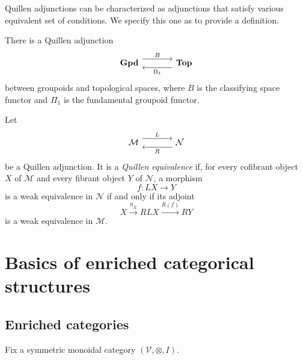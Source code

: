 \documentclass{tac}
\begin{document}
Quillen adjunctions can be characterized as adjunctions that satisfy various equivalent set of conditions. We specify this one as to provide a definition.

\begin{example}
There is a Quillen adjunction
\[
\begin{tikzcd}[column sep=large]
\mathbf{Gpd}
\arrow[r, shift left=1.2ex, "B"]
&
\mathbf{Top}
\arrow[l, shift left=1.2ex, "\Pi_1"]
\end{tikzcd}
\]
between groupoids and topological spaces, where $B$ is the classifying space
functor and $\Pi_1$ is the fundamental groupoid functor.
\end{example}

\begin{definition}
Let
\[
\begin{tikzcd}[column sep=large]
\mathcal{M}
\arrow[r, shift left=1.2ex, "L"]
&
\mathcal{N}
\arrow[l, shift left=1.2ex, "R"]
\end{tikzcd}
\]
be a Quillen adjunction. It is a \emph{Quillen equivalence} if, for every
cofibrant object $X$ of $\mathcal{M}$ and every fibrant object $Y$ of
$\mathcal{N}$, a morphism
\[
f:LX\longrightarrow Y
\]
is a weak equivalence in $\mathcal{N}$ if and only if its adjoint
\[
X\xrightarrow{\eta_X}RLX\xrightarrow{R(f)}RY
\]
is a weak equivalence in $\mathcal{M}$.
\end{definition}



 \section{Basics of enriched categorical structures}

 \subsection*{Enriched categories}
Fix a symmetric monoidal category $(\mathcal{V},\otimes,I)$.
\end{document}
